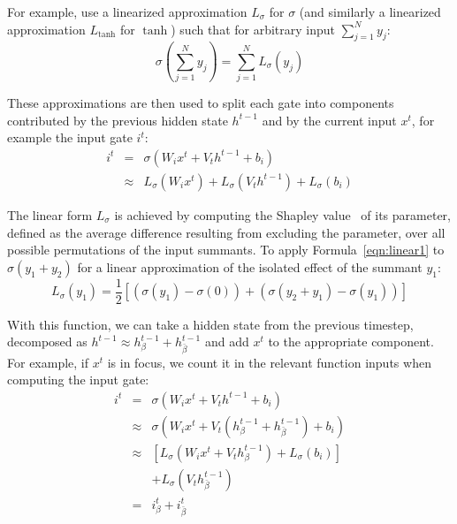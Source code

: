 For example, \citet{murdoch_beyond_2018} use a linearized approximation $L_{\sigma}$ for $\sigma$ (and similarly a linearized approximation $L_{\tanh}$ for $\tanh$) such that for arbitrary input $\sum_{j=1}^{N} y_j$: 
\begin{equation}\label{eqn:linear1}
\sigma{\left(\sum_{j=1}^{N} y_j\right)} = \sum_{j=1}^{N} L_{\sigma}(y_j)
\end{equation}

These approximations are then used to split each gate into components contributed by the previous hidden state $h^{t-1}$ and by the current input $x^t$, for example the input gate $i^t$:
\begin{equation} 
\begin{aligned}
i^t &=& \sigma(W_i x^t + V_t h^{t-1} + b_i)\\
&\approx& L_{\sigma}(W_i x^t) + L_{\sigma}(V_t h^{t-1}) + L_{\sigma}(b_i)
\end{aligned}
\end{equation}

The linear form $L_{\sigma}$ is achieved by computing the Shapley value~\citep{shapley_stochastic_1953} of its parameter, defined as the average difference resulting from excluding the parameter, over all possible permutations of the input summants. To apply Formula~\ref{eqn:linear1} to $\sigma{(y_1 + y_2)}$ for a linear approximation of the isolated effect of the summant $y_1$:
\begin{equation}
L_{\sigma}(y_1) = \frac{1}{2} [(\sigma(y_1) - \sigma(0)) + (\sigma(y_2 + y_1) - \sigma(y_1)) ]
\end{equation}

With this function, we can take a hidden state from the previous timestep, decomposed as $h^{t-1} \approx h^{t-1}_{\beta} + h^{t-1}_{\bar{\beta}}$ and add $x^t$ to the appropriate component. For example, if $x^t$ is in focus, we count it in the relevant function inputs when computing the input gate:
\begin{eqnarray*}
i^t &=& \sigma(W_i x^t + V_t h^{t-1} + b_i)\\
&\approx& \sigma(W_i x^t + V_t (h^{t-1}_{\beta} + h^{t-1}_{\bar{\beta}}) + b_i)\\
&\approx& [L_{\sigma}(W_i x^t + V_t h^{t-1}_{\beta}) + L_{\sigma}(b_i)]\\ 
&&+ L_{\sigma}(V_t h^{t-1}_{\bar{\beta}})\\ 
&=& i^t_{\beta} + i^{t}_{\bar{\beta}}
\end{eqnarray*}{}

